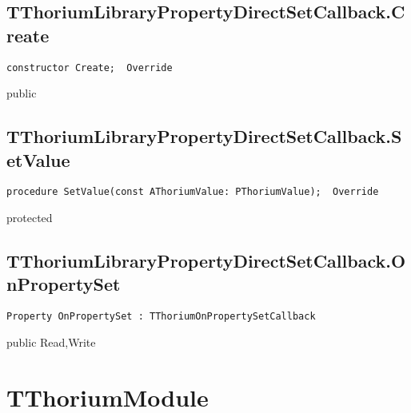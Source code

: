 \subsection{TThoriumLibraryPropertyDirectSetCallback.Create}
\label{thoriumcorepkg:thorium:tthoriumlibrarypropertydirectsetcallback:create}
\begin{FPCList}
\Declaration 

\begin{verbatim}
constructor Create;  Override
\end{verbatim}
\Visibility
public
\end{FPCList}
\subsection{TThoriumLibraryPropertyDirectSetCallback.SetValue}
\label{thoriumcorepkg:thorium:tthoriumlibrarypropertydirectsetcallback:setvalue}
\begin{FPCList}
\Declaration 

\begin{verbatim}
procedure SetValue(const AThoriumValue: PThoriumValue);  Override
\end{verbatim}
\Visibility
protected
\end{FPCList}
\subsection{TThoriumLibraryPropertyDirectSetCallback.OnPropertySet}
\label{thoriumcorepkg:thorium:tthoriumlibrarypropertydirectsetcallback:onpropertyset}
\begin{FPCList}
\Declaration 

\begin{verbatim}
Property OnPropertySet : TThoriumOnPropertySetCallback
\end{verbatim}
\Visibility
public
\Access
Read,Write
\end{FPCList}
\section{TThoriumModule}
\label{thoriumcorepkg:thorium:tthoriummodule}
